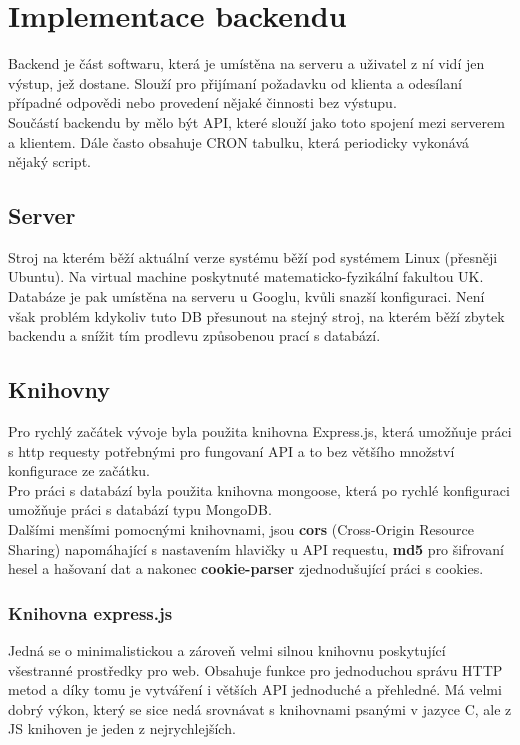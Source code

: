 \chapter{Implementace backendu}
Backend je část softwaru, která je umístěna na serveru a uživatel
z ní vidí jen výstup, jež dostane. Slouží pro přijímaní požadavku od
klienta a odesílaní případné odpovědi nebo provedení nějaké činnosti bez výstupu. 
\\
Součástí backendu by mělo být API, které slouží jako toto spojení mezi
serverem a klientem. Dále často obsahuje CRON tabulku, která periodicky
vykonává nějaký script.

\section{Server}
Stroj na kterém běží aktuální verze systému běží pod systémem Linux (přesněji Ubuntu).
Na virtual machine poskytnuté matematicko-fyzikální fakultou UK.
\\
Databáze je pak umístěna na serveru u Googlu, kvůli snazší konfiguraci.
Není však problém kdykoliv tuto DB přesunout na stejný stroj, na kterém běží
zbytek backendu a snížit tím prodlevu způsobenou prací s databází.


\section{Knihovny}
Pro rychlý začátek vývoje byla použita knihovna Express.js, která
umožňuje práci s http requesty potřebnými pro fungovaní API a to 
bez většího množství konfigurace ze začátku.
\\
Pro práci s databází byla použita knihovna mongoose, která po rychlé konfiguraci
umožňuje práci s databází typu MongoDB.
\\
Dalšími menšími pomocnými knihovnami, jsou
\textbf{cors} (Cross-Origin Resource Sharing) napomáhající s nastavením hlavičky u API requestu,
\textbf{md5} pro šifrovaní hesel a hašovaní dat a nakonec
\textbf{cookie-parser} zjednodušující práci s cookies.

\subsection{Knihovna express.js}
Jedná se o minimalistickou a zároveň velmi silnou knihovnu poskytující všestranné prostředky pro web.
Obsahuje funkce pro jednoduchou správu HTTP metod a díky tomu je vytváření i větších API jednoduché a přehledné.
Má velmi dobrý výkon, který se sice nedá srovnávat s knihovnami psanými v jazyce C, ale
z JS knihoven je jeden z nejrychlejších.


